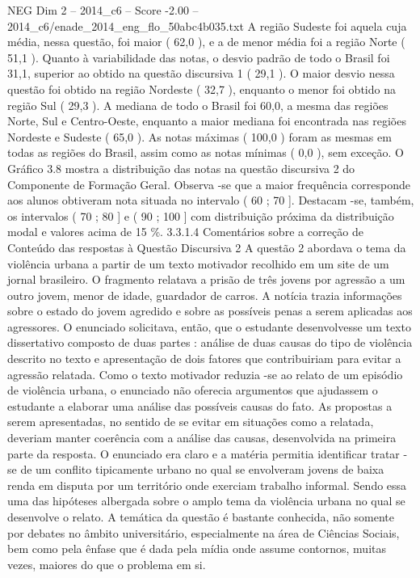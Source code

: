 \begin{textsample}{NEG Dim 2 – 2014\_c6 – Score -2.00 – 2014\_c6/enade\_2014\_eng\_flo\_50abc4b035.txt}
A região Sudeste foi aquela cuja média, nessa questão, foi maior ( 62,0 ), e a de menor média foi a região Norte ( 51,1 ).
Quanto à variabilidade das notas, o desvio padrão de todo o Brasil foi 31,1, superior ao obtido na questão discursiva 1 ( 29,1 ).
O maior desvio nessa questão foi obtido na região Nordeste ( 32,7 ), enquanto o menor foi obtido na região Sul ( 29,3 ).
A mediana de todo o Brasil foi 60,0, a mesma das regiões Norte, Sul e Centro-Oeste, enquanto a maior mediana foi encontrada nas regiões Nordeste e Sudeste ( 65,0 ).
As notas máximas ( 100,0 ) foram as mesmas em todas as regiões do Brasil, assim como as notas mínimas ( 0,0 ), sem exceção.
O Gráfico 3.8 mostra a distribuição das notas na questão discursiva 2 do Componente de Formação Geral.
Observa -se que a maior frequência corresponde aos alunos obtiveram nota situada no intervalo ( 60 ; 70 ].
Destacam -se, também, os intervalos ( 70 ; 80 ] e ( 90 ; 100 ] com distribuição próxima da distribuição modal e valores acima de 15 \%. 3.3.1.4 Comentários sobre a correção de Conteúdo das respostas à Questão Discursiva 2 A questão 2 abordava o tema da violência urbana a partir de um texto motivador recolhido em um site de um jornal brasileiro.
O fragmento relatava a prisão de três jovens por agressão a um outro jovem, menor de idade, guardador de carros.
A notícia trazia informações sobre o estado do jovem agredido e sobre as possíveis penas a serem aplicadas aos agressores.
O enunciado solicitava, então, que o estudante desenvolvesse um texto dissertativo composto de duas partes : análise de duas causas do tipo de violência descrito no texto e apresentação de dois fatores que contribuiriam para evitar a agressão relatada.
Como o texto motivador reduzia -se ao relato de um episódio de violência urbana, o enunciado não oferecia argumentos que ajudassem o estudante a elaborar uma análise das possíveis causas do fato.
As propostas a serem apresentadas, no sentido de se evitar em situações como a relatada, deveriam manter coerência com a análise das causas, desenvolvida na primeira parte da resposta.
O enunciado era claro e a matéria permitia identificar tratar -se de um conflito tipicamente urbano no qual se envolveram jovens de baixa renda em disputa por um território onde exerciam trabalho informal.
Sendo essa uma das hipóteses albergada sobre o amplo tema da violência urbana no qual se desenvolve o relato.
A temática da questão é bastante conhecida, não somente por debates no âmbito universitário, especialmente na área de Ciências Sociais, bem como pela ênfase que é dada pela mídia onde assume contornos, muitas vezes, maiores do que o problema em si.

\end{textsample}
